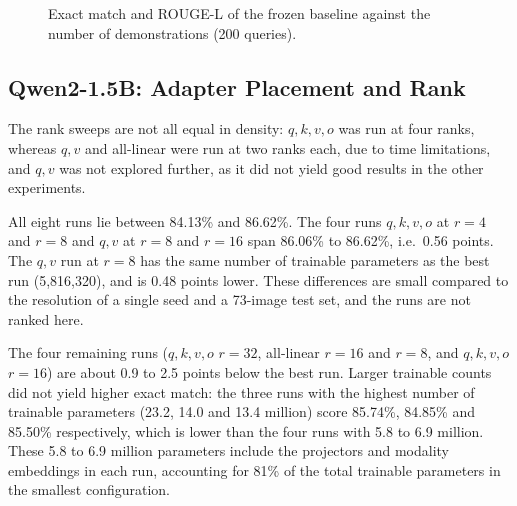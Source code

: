 \documentclass[conference]{IEEEtran}
\begin{document}
\begin{figure}[!t]
  \centering
  \caption{Exact match and ROUGE-L of the frozen baseline against the number of demonstrations (200 queries).}
  \label{fig:shots}
\end{figure}

\subsection{Qwen2-1.5B: Adapter Placement and Rank}\label{sec:qwen}

The rank sweeps are not all equal in density: $q,k,v,o$ was run at four ranks, whereas $q,v$ and all-linear were run at two ranks each, due to time limitations, and $q,v$ was not explored further, as it did not yield good results in the other experiments.

All eight runs lie between 84.13\% and 86.62\%. The four runs $q,k,v,o$ at $r=4$ and $r=8$ and $q,v$ at $r=8$ and $r=16$ span 86.06\% to 86.62\%, i.e.\ 0.56 points. The $q,v$ run at $r=8$ has the same number of trainable parameters as the best run (5,816,320), and is 0.48 points lower. These differences are small compared to the resolution of a single seed and a 73-image test set, and the runs are not ranked here.

The four remaining runs ($q,k,v,o$ $r=32$, all-linear $r=16$ and $r=8$, and $q,k,v,o$ $r=16$) are about 0.9 to 2.5 points below the best run. Larger trainable counts did not yield higher exact match: the three runs with the highest number of trainable parameters (23.2, 14.0 and 13.4 million) score 85.74\%, 84.85\% and 85.50\% respectively, which is lower than the four runs with 5.8 to 6.9 million. These 5.8 to 6.9 million parameters include the projectors and modality embeddings in each run, accounting for 81\% of the total trainable parameters in the smallest configuration.
\end{document}
